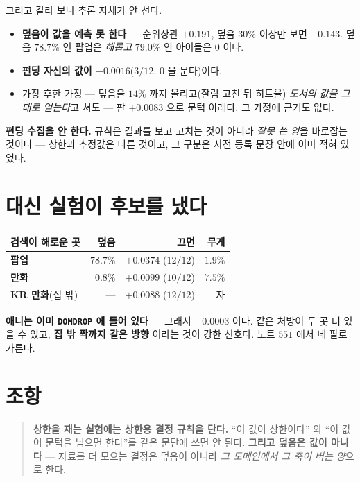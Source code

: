 \documentclass[11pt]{article}
\begin{document}
그리고 갈라 보니 추론 자체가 안 선다.

\begin{itemize}
\item \textbf{덮음이 값을 예측 못 한다} --- 순위상관 $+0.191$, 덮음
$30\%$ 이상만 보면 $-0.143$. 덮음 $78.7\%$ 인 팝업은 \emph{해롭고}
$79.0\%$ 인 아이돌은 $0$ 이다.
\item \textbf{펀딩 자신의 값이 $-0.0016$}($3/12$, $0$ 을 문다)이다.
\item 가장 후한 가정 --- 덮음을 $14\%$ 까지 올리고(잘림 고친 뒤 히트율)
\emph{도서의 값을 그대로 얻는다}고 쳐도 --- 판 $\mathbf{+0.0083}$ 으로
문턱 아래다. 그 가정에 근거도 없다.
\end{itemize}

\textbf{펀딩 수집을 안 한다.} 규칙은 결과를 보고 고치는 것이 아니라
\emph{잘못 쓴 양}을 바로잡는 것이다 --- 상한과 추정값은 다른 것이고,
그 구분은 사전 등록 문장 안에 이미 적혀 있었다.

\section{대신 실험이 후보를 냈다}

\begin{center}
\begin{tabular}{lrrr}
\hline
검색이 해로운 곳 & 덮음 & 끄면 & 무게 \\
\hline
\textbf{팝업} & $78.7\%$ & $\mathbf{+0.0374}$ ($12/12$) & $1.9\%$ \\
\textbf{만화} & $0.8\%$ & $\mathbf{+0.0099}$ ($10/12$) & $7.5\%$ \\
\textbf{KR 만화}(집 밖) & --- & $\mathbf{+0.0088}$ ($12/12$) & 자 \\
\hline
\end{tabular}
\end{center}

\textbf{애니는 이미 \texttt{DOMDROP} 에 들어 있다} --- 그래서 $-0.0003$
이다. 같은 처방이 두 곳 더 있을 수 있고, \textbf{집 밖 짝까지 같은 방향}
이라는 것이 강한 신호다. 노트 $551$ 에서 네 팔로 가른다.

\section*{조항}

\begin{quote}
\textbf{상한을 재는 실험에는 상한용 결정 규칙을 단다.} ``이 값이 상한이다''
와 ``이 값이 문턱을 넘으면 한다''를 같은 문단에 쓰면 안 된다.
\textbf{그리고 덮음은 값이 아니다} --- 자료를 더 모으는 결정은 덮음이 아니라
\emph{그 도메인에서 그 축이 버는 양}으로 한다.
\end{quote}
\end{document}

